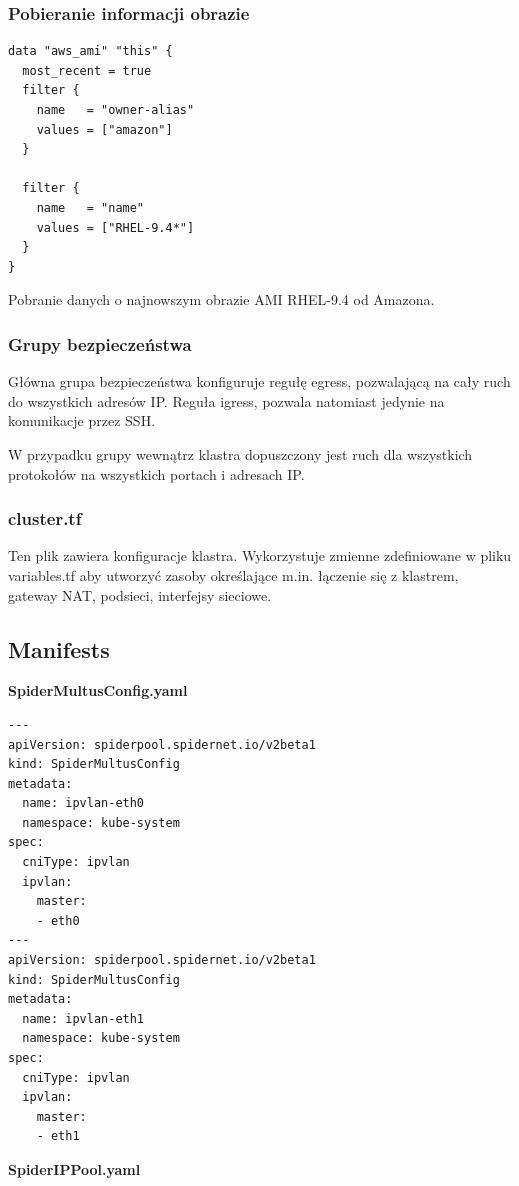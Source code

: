 \documentclass[onecolumn,12pt]{article}
\begin{document}
\subsubsection{Pobieranie informacji obrazie}
\begin{lstlisting}[style=terraform]
data "aws_ami" "this" {
  most_recent = true
  filter {
    name   = "owner-alias"
    values = ["amazon"]
  }

  filter {
    name   = "name"
    values = ["RHEL-9.4*"]
  }
}
\end{lstlisting}


Pobranie danych o najnowszym obrazie AMI RHEL-9.4 od Amazona.

\subsubsection{Grupy bezpieczeństwa}
Główna grupa bezpieczeństwa konfiguruje regułę egress, pozwalającą na cały ruch do wszystkich adresów IP. Reguła igress, pozwala natomiast jedynie na komunikacje przez SSH.

W przypadku grupy wewnątrz klastra dopuszczony jest ruch dla wszystkich protokołów na wszystkich portach i adresach IP.



\subsubsection{cluster.tf}
Ten plik zawiera konfiguracje klastra. Wykorzystuje zmienne zdefiniowane w pliku variables.tf aby utworzyć zasoby określające m.in. łączenie się z klastrem, gateway NAT, podsieci, interfejsy sieciowe.

\subsection{Manifests}

\textbf{SpiderMultusConfig.yaml}
\begin{lstlisting}[style=yaml]
---
apiVersion: spiderpool.spidernet.io/v2beta1
kind: SpiderMultusConfig
metadata:
  name: ipvlan-eth0
  namespace: kube-system
spec:
  cniType: ipvlan
  ipvlan:
    master:
    - eth0
---
apiVersion: spiderpool.spidernet.io/v2beta1
kind: SpiderMultusConfig
metadata:
  name: ipvlan-eth1
  namespace: kube-system
spec:
  cniType: ipvlan
  ipvlan:
    master:
    - eth1
\end{lstlisting}

\textbf{SpiderIPPool.yaml}
\begin{lstlisting}[style=yaml]
\end{lstlisting}
\end{document}
